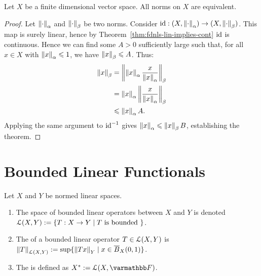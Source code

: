 \begin{theorem}\label{thm:norms-on-fdvs-are-equiv}
Let $X$ be a finite dimensional vector space. All norms on $X$ are equivalent.
\end{theorem}
    \begin{proof}
        Let $\left\lVert \cdot \right\rVert_\alpha$ and $\left\lVert \cdot \right\rVert_\beta$ be two norms. Consider $\operatorname{id}:(X,\left\lVert \cdot \right\rVert_\alpha) \rightarrow (X,\left\lVert \cdot \right\rVert_\beta)$. This map is surely linear, hence by Theorem~\ref{thm:fdnls-lin-implies-cont} $\operatorname{id}$ is continuous. Hence we can find some $A>0$ sufficiently large such that, for all $x \in X$ with $\left\lVert x \right\rVert_\alpha \leqslant 1$, we have $\left\lVert x \right\rVert_\beta \leqslant A$. Thus:
            \begin{equation*}
            \begin{split}
                \left\lVert x \right\rVert_\beta 
                & = \left\lVert \left\lVert x \right\rVert_\alpha \frac{x}{\left\lVert x \right\rVert_\alpha} \right\rVert_\beta \\
                & = \left\lVert x \right\rVert_\alpha \left\lVert \frac{x}{\left\lVert x \right\rVert_\alpha} \right\rVert_\beta \\
                & \leqslant \left\lVert x \right\rVert_\alpha A.
            \end{split}
            \end{equation*}
        Applying the same argument to $\operatorname{id}^{-1}$ gives $\left\lVert x \right\rVert_\alpha \leqslant \left\lVert x \right\rVert_\beta B$, establishing the theorem.
    \end{proof}

\section{Bounded Linear Functionals}

\begin{definition}
    Let $X$ and $Y$ be normed linear spaces.
    \begin{enumerate}[label = (\arabic*),itemsep=1pt,topsep=3pt]
        \item The space of bounded linear operators between $X$ and $Y$ is denoted $\mathcal{L}(X,Y) := \{T:X \rightarrow Y \mid T \text{ is bounded }\}$.
        \item The  of a bounded linear operator $T \in \mathcal{L}(X,Y)$ is $\left\lVert T \right\rVert_{\mathcal{L}(X,Y)}:= \sup\{\left\lVert Tx \right\rVert_Y \mid x \in \overline{B}_X(0,1)\}$.
        \item The  is defined as $X^\ast := \cL(X,\bfF)$.
    \end{enumerate}
\end{definition}

